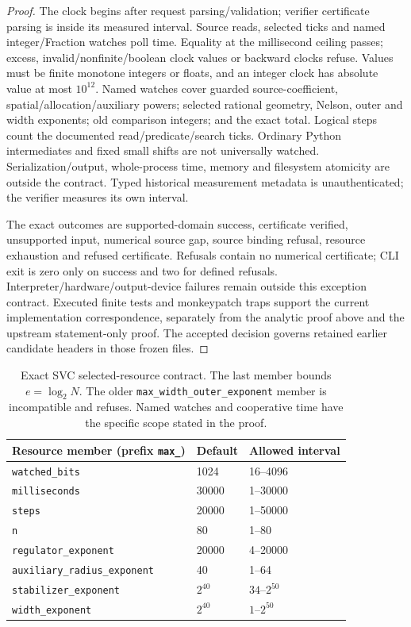 \documentclass[11pt]{article}
\theoremstyle{plain}
\theoremstyle{definition}
\theoremstyle{remark}
\begin{document}
\begin{proof}
The clock begins after request parsing/validation; verifier certificate
parsing is inside its measured interval. Source reads, selected ticks
and named integer/Fraction watches poll time. Equality at the millisecond
ceiling passes; excess, invalid/nonfinite/boolean clock values or
backward clocks refuse. Values must be finite monotone integers or floats,
and an integer clock has absolute value at most $10^{12}$.
Named watches cover guarded source-coefficient,
spatial/allocation/auxiliary powers; selected rational geometry, Nelson,
outer and width exponents; old comparison integers; and the exact total.
Logical steps count the documented read/predicate/search ticks. Ordinary
Python intermediates and fixed small shifts are not universally watched.
Serialization/output, whole-process time, memory and filesystem atomicity
are outside the contract. Typed historical measurement metadata is
unauthenticated; the verifier measures its own interval.

The exact outcomes are supported-domain success, certificate verified,
unsupported input, numerical source gap, source binding refusal, resource
exhaustion and refused certificate. Refusals contain no numerical
certificate; CLI exit is zero only on success and two for defined
refusals. Interpreter/hardware/output-device failures remain outside this
exception contract. Executed finite tests and monkeypatch traps support
the current implementation correspondence, separately from the analytic
proof above and the upstream statement-only proof. The accepted decision
governs retained earlier candidate headers in those frozen files.
\end{proof}

\begin{table}[htbp]
\centering\small
\begin{tabular}{lll}\toprule
Resource member (prefix \texttt{max\_})&Default&Allowed interval\\\midrule
\texttt{watched\_bits}&1024&16--4096\\
\texttt{milliseconds}&30000&1--30000\\
\texttt{steps}&20000&1--50000\\
\texttt{n}&80&1--80\\
\texttt{regulator\_exponent}&20000&4--20000\\
\texttt{auxiliary\_radius\_exponent}&40&1--64\\
\texttt{stabilizer\_exponent}&$2^{40}$&$34$--$2^{50}$\\
\texttt{width\_exponent}&$2^{40}$&$1$--$2^{50}$\\\bottomrule
\end{tabular}
\caption{Exact SVC selected-resource contract. The last member bounds
$e=\log_2N$. The older \texttt{max\_width\_outer\_exponent} member is
incompatible and refuses. Named watches and cooperative time have the
specific scope stated in the proof.}\label{sva:resources}
\end{table}
\end{document}

